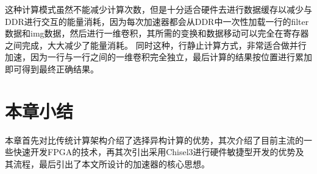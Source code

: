 这种计算模式虽然不能减少计算次数，但是十分适合硬件去进行数据缓存以减少与DDR进行交互的能量消耗，因为每次加速器都会从DDR中一次性加载一行的filter数据和img数据，然后进行一维卷积，其所需的变换和数据移动可以完全在寄存器之间完成，大大减少了能量消耗。
同时这种，行静止计算方式，非常适合做并行加速，因为一行与一行之间的一维卷积完全独立，最后计算的结果按位置进行累加即可得到最终正确结果。



\section{本章小结}
本章首先对比传统计算架构介绍了选择异构计算的优势，其次介绍了目前主流的一些快速开发FPGA的技术，再其次引出采用Chisel3进行硬件敏捷型开发的优势及其流程，最后引出了本文所设计的加速器的核心思想。






